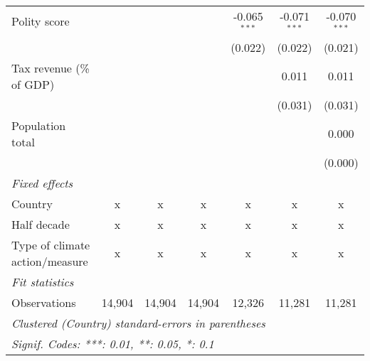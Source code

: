 \begin{tabular}{lcccccc}
   Polity score                                                  &              &              &              & -0.065$^{***}$ & -0.071$^{***}$ & -0.070$^{***}$\\   
                                                                 &              &              &              & (0.022)        & (0.022)        & (0.021)\\   
   Tax revenue (\% of GDP)                                       &              &              &              &                & 0.011          & 0.011\\   
                                                                 &              &              &              &                & (0.031)        & (0.031)\\   
   Population total                                              &              &              &              &                &                & 0.000\\   
                                                                 &              &              &              &                &                & (0.000)\\   
   \emph{Fixed effects}\\
   Country                                                       & x            & x            & x            & x              & x              & x\\  
   Half decade                                                   & x            & x            & x            & x              & x              & x\\  
   Type of climate action/measure                                & x            & x            & x            & x              & x              & x\\  
   \midrule \emph{Fit statistics}\\
   Observations                                                  & 14,904       & 14,904       & 14,904       & 12,326         & 11,281         & 11,281\\  
   \midrule
   \multicolumn{7}{l}{\emph{Clustered (Country) standard-errors in parentheses}}\\
   \multicolumn{7}{l}{\emph{Signif. Codes: ***: 0.01, **: 0.05, *: 0.1}}\\
\end{tabular}
\par\endgroup


